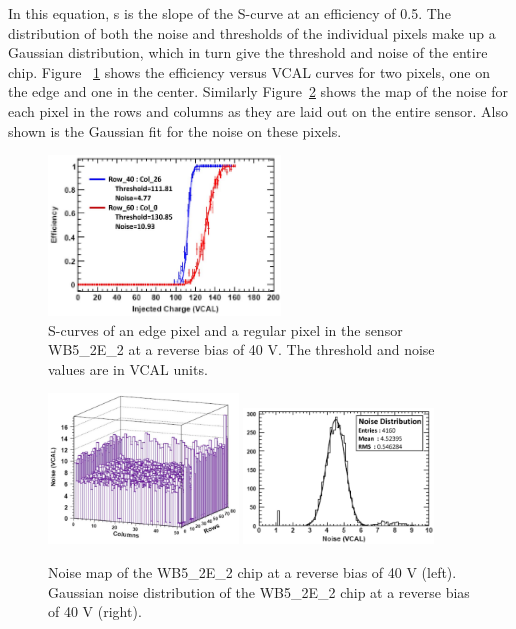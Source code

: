 In this equation, s is the slope of the S-curve at an efficiency of 0.5. The distribution of both the noise and thresholds of the individual pixels make up a Gaussian distribution, which in turn give the threshold and noise of the entire chip. Figure ~\ref{fig:eff_3D} shows the efficiency versus VCAL curves for two pixels, one on the edge and one in the center. Similarly Figure~\ref{fig:noise} shows the map of the noise for each pixel in the rows and columns as they are laid out on the entire sensor.  Also shown is the Gaussian fit for the noise on these pixels.


\begin{figure}[htb!]
\begin{center}
\centerline{
\includegraphics[width=0.55\textwidth]{3D/efficiency.pdf}
}
\caption{S-curves of an edge pixel and a regular pixel in the sensor WB5\_2E\_2
at a reverse bias of 40 V. The threshold and noise values are in VCAL units.~\cite{5734879} }
\label{fig:eff_3D}
\end{center}
\end{figure}

\begin{figure}[htb!]
\begin{center}
\centerline{
\includegraphics[width=0.45\textwidth]{3D/map.pdf}
\includegraphics[width=0.45\textwidth]{3D/noise.pdf}
}
\caption{Noise map of the WB5\_2E\_2 chip at a reverse bias of 40 V (left). Gaussian noise distribution of the WB5\_2E\_2 chip at a reverse bias of 40 V (right). ~\cite{5734879} }
\label{fig:noise}
\end{center}
\end{figure}

